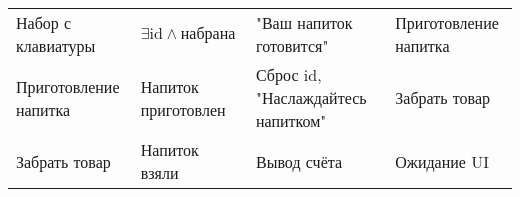 \documentclass[10pt]{article}
\begin{document}
\begin{tabularx}{\textwidth}{X|X|X|X}
Набор с клавиатуры          & \( \exists \text{id} \land \text{набрана сумма} \)         &"Ваш напиток готовится"                             &Приготовление напитка   \\
Приготовление напитка       &Напиток приготовлен                                         &Сброс id, "Наслаждайтесь напитком"                  &Забрать товар           \\
Забрать товар               &Напиток взяли                                               &Вывод счёта                                         &Ожидание UI             \\
\end{tabularx} 
\end{document}
